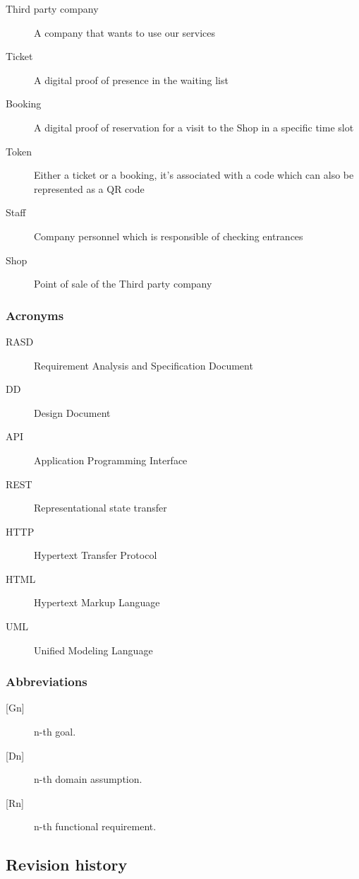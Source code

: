 \begin{description}
    \item [Third party company] A company that wants to use our services
    \item [Ticket] A digital proof of presence in the waiting list
    \item [Booking] A digital proof of reservation for a visit to the Shop in a specific time slot
    \item [Token] Either a ticket or a booking, it's associated with a code which can also be represented as a QR code
    \item [Staff] Company personnel which is responsible of checking entrances
    \item [Shop] Point of sale of the Third party company
\end{description}
\subsubsection{Acronyms}

\begin{description}
    \item [RASD] Requirement Analysis and Specification Document
    \item [DD] Design Document
    \item [API] Application Programming Interface
    \item [REST] Representational state transfer
    \item [HTTP] Hypertext Transfer Protocol
    \item [HTML] Hypertext Markup Language
    \item [UML] Unified Modeling Language
\end{description}
\subsubsection{Abbreviations}

\begin{description}
    \item [{[Gn]}] n-th goal.
    \item [{[Dn]}] n-th domain assumption.
    \item [{[Rn]}] n-th functional requirement.
\end{description}

\subsection{Revision history}

